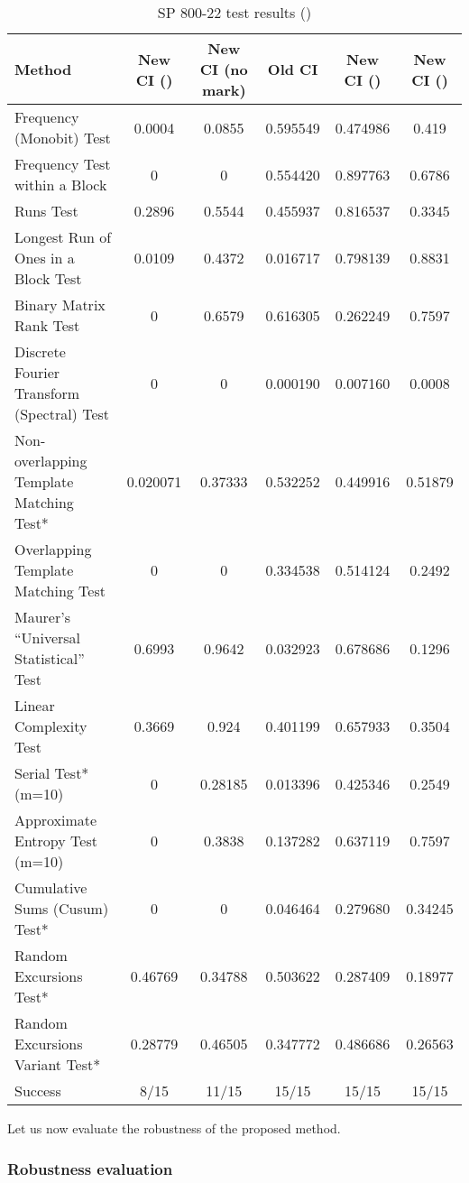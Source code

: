 \documentclass[journal]{IEEEtran}
\begin{document}
\begin{table*}[!t]
\renewcommand{\arraystretch}{1.3}
\caption{SP 800-22 test results ()}
\label{The passing rate}
\centering
\begin{tabular}{|l||c|c|c|c|c|}
\hline
Method & New CI ()& New CI (no mark)& Old CI & New CI ()&New CI ()\\ \hline\hline

Frequency (Monobit) Test 			&0.0004&0.0855	&0.595549&0.474986 &0.419\\ \hline
Frequency Test within a Block  		&0&0	&0.554420&0.897763&0.6786\\ \hline
Runs Test  					&0.2896&0.5544	&0.455937&0.816537&0.3345\\ \hline
Longest Run of Ones in a Block Test 		&0.0109&0.4372	&0.016717&0.798139&0.8831 \\ \hline
Binary Matrix Rank Test  			&0&0.6579	&0.616305&0.262249&0.7597\\ \hline
Discrete Fourier Transform (Spectral) Test 	&0&0	&0.000190&0.007160&0.0008 \\ \hline
Non-overlapping Template Matching Test* 	&0.020071&0.37333&0.532252&0.449916& 0.51879\\ \hline
Overlapping Template Matching Test	&0&0	 &0.334538&0.514124 	&0.2492\\ \hline
Maurer's ``Universal Statistical'' Test  	&0.6993&0.9642	&0.032923&0.678686&0.1296\\ \hline
Linear Complexity Test 			&0.3669&0.924	&0.401199&0.657933 &0.3504\\ \hline
Serial Test* (m=10) 			&0&0.28185&0.013396&0.425346 	&0.2549\\ \hline
Approximate Entropy Test (m=10) 	&0&0.3838	&0.137282&0.637119 	&0.7597\\ \hline
Cumulative Sums (Cusum) Test* 		&0&0	&0.046464&0.279680&0.34245\\ \hline
Random Excursions Test* 			&0.46769&0.34788&0.503622&0.287409 &0.18977\\ \hline
Random Excursions Variant Test* 		&0.28779&0.46505&0.347772&0.486686& 0.26563\\ \hline
Success 				&8/15&11/15	& 15/15 & 15/15 	&15/15\\ \hline
\hline
\end{tabular}
\end{table*}

Let us now evaluate the robustness of the proposed method.


\subsubsection{Robustness evaluation}
\end{document}
